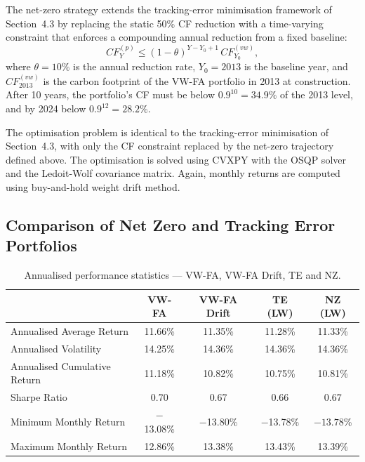 \documentclass[11pt,a4paper]{article}
\begin{document}
The net-zero strategy extends the tracking-error minimisation framework of Section~4.3 by replacing the static 50\% CF reduction with a time-varying constraint that enforces a compounding annual reduction from a fixed baseline:
\begin{equation}
CF_Y^{(p)} \leq (1 - \theta)^{Y - Y_0 + 1} \, CF_{Y_0}^{(vw)},
\end{equation}
where $\theta = 10\%$ is the annual reduction rate, $Y_0 = 2013$ is the baseline year, and $CF_{2013}^{(vw)}$ is the carbon footprint of the VW-FA portfolio in 2013 at construction. After 10 years, the portfolio's CF must be below $0.9^{10} = 34.9\%$ of the 2013 level, and by 2024 below $0.9^{12} = 28.2\%$.

The optimisation problem is identical to the tracking-error minimisation of Section~4.3, with only the CF constraint replaced by the net-zero trajectory defined above. The optimisation is solved using CVXPY with the OSQP solver and the Ledoit-Wolf covariance matrix. Again, monthly returns are computed using buy-and-hold weight drift method.

\subsection{Comparison of Net Zero and Tracking Error Portfolios}

\begin{table}[H]
\centering
\captionsetup{justification=centering}
\caption{Annualised performance statistics --- VW-FA, VW-FA Drift, TE and NZ.}
\label{tab:stats_nz_all}
\begin{tabular}{lcccc}
\toprule
& \textbf{VW-FA} & \textbf{VW-FA Drift} & \textbf{TE (LW)} & \textbf{NZ (LW)}\\[4pt]
\midrule
Annualised Average Return       & 11.66\% & 11.35\% & 11.28\% & 11.33\% \\[4pt]
Annualised Volatility           & 14.25\% & 14.36\% & 14.36\% & 14.36\% \\[4pt]
Annualised Cumulative Return    & 11.18\% & 10.82\% & 10.75\% & 10.81\% \\[4pt]
Sharpe Ratio                    & 0.70    & 0.67    & 0.66    & 0.67  \\[4pt]
Minimum Monthly Return          & $-$13.08\% & $-$13.80\% & $-$13.78\% & $-13.78$\%  \\[4pt]
Maximum Monthly Return          & 12.86\% & 13.38\% & 13.43\% & 13.39\%  \\
\bottomrule
\end{tabular}
\end{table}
\end{document}
